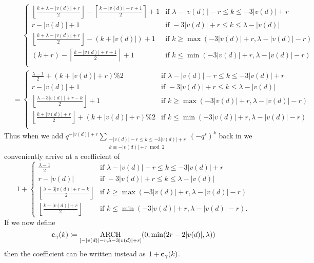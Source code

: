 \begin{align*}
  &\phantom=
  \begin{cases}
    \left\lfloor \frac{k+\lambda-|v(d)|+r}{2} \right\rfloor - \left\lceil \frac{k-|v(d)|+r+1}{2} \right\rceil + 1 &\text{if } \lambda-|v(d)|-r \le k \le -3|v(d)|+r \\
    r-|v(d)|+1 &\text{if } -3|v(d)|+r \le k \le \lambda-|v(d)| \\
    \left\lfloor \frac{k+\lambda-|v(d)|+r}{2} \right\rfloor - (k+|v(d)|) + 1 &\text{if } k \ge \max(-3|v(d)|+r, \lambda-|v(d)|-r) \\
    (k+r) - \left\lceil \frac{k-|v(d)|+r+1}{2} \right\rceil + 1 &\text{if } k \le \min(-3|v(d)|+r, \lambda-|v(d)|-r) \\
  \end{cases} \\
  &=
  \begin{cases}
    \frac{\lambda-1}{2} + (k+|v(d)|+r)\%2 &\text{if } \lambda-|v(d)|-r \le k \le -3|v(d)|+r \\
    r-|v(d)|+1 &\text{if } -3|v(d)|+r \le k \le \lambda-|v(d)| \\
    \left\lfloor \frac{\lambda-3|v(d)|+r-k}{2} \right\rfloor + 1 &\text{if } k \ge \max(-3|v(d)|+r, \lambda-|v(d)|-r) \\
    \left\lfloor \frac{k+|v(d)|+r}{2} \right\rfloor + (k+|v(d)|+r)\%2 &\text{if } k \le \min(-3|v(d)|+r, \lambda-|v(d)|-r) \\
  \end{cases}
\end{align*}
Thus when we add
$q^{-|v(d)|+r} \sum_{\substack{-|v(d)|-r \le k \le -3|v(d)|+r \\ k \equiv -|v(d)|+r \bmod 2}} (-q^s)^k$
back in we conveniently arrive at a coefficient of
\[
  1 +
  \begin{cases}
    \frac{\lambda-1}{2} &\text{if } \lambda-|v(d)|-r \le k \le -3|v(d)|+r \\
    r-|v(d)| &\text{if } -3|v(d)|+r \le k \le \lambda-|v(d)| \\
    \left\lfloor \frac{\lambda-3|v(d)|+r-k}{2} \right\rfloor &\text{if } k \ge \max(-3|v(d)|+r, \lambda-|v(d)|-r) \\
    \left\lfloor \frac{k+|v(d)|+r}{2} \right\rfloor &\text{if } k \le \min(-3|v(d)|+r, \lambda-|v(d)|-r).
  \end{cases}
\]
If we now define
\[ \mathbf c_\gamma(k) \coloneqq \operatorname*{ARCH}_{[-|v(d)|-r, \lambda-3|v(d)|+r]} (0, \min(2r-2|v(d)|, \lambda)) \]
then the coefficient can be written instead as
$1 + \mathbf c_\gamma(k)$.

